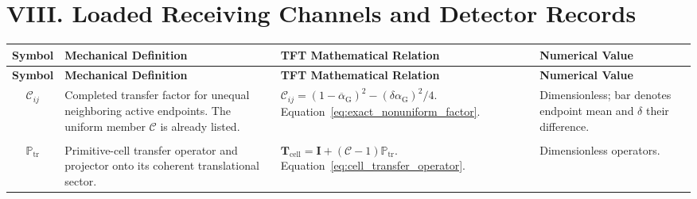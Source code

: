 \newpage
\section*{VIII. Loaded Receiving Channels and Detector Records}

\vspace{0.5cm}
\noindent
\renewcommand{\arraystretch}{1.6}
\begin{longtable}{@{} c p{5.5cm} p{4cm} p{3.5cm} @{}}
\toprule
\textbf{Symbol} & {\raggedright \textbf{Mechanical Definition}\par} & {\raggedright \textbf{TFT Mathematical Relation}\par} & {\raggedright \textbf{Numerical Value}\par} \\
\midrule
\endfirsthead

\toprule
\textbf{Symbol} & {\raggedright \textbf{Mechanical Definition}\par} & {\raggedright \textbf{TFT Mathematical Relation}\par} & {\raggedright \textbf{Numerical Value}\par} \\
\midrule
\endhead

$\mathcal C_{ij}$ & {\raggedright Completed transfer factor for unequal neighboring active endpoints. The uniform member $\mathcal C$ is already listed.\par} & {\raggedright $\mathcal C_{ij}=(1-\overline\alpha_{\mathrm G})^2-(\delta\alpha_{\mathrm G})^2/4$. \newline Equation~\eqref{eq:exact_nonuniform_factor}.\par} & {\raggedright Dimensionless; bar denotes endpoint mean and $\delta$ their difference.\par} \\

\begin{tabular}[c]{@{}c@{}}$\mathbf T_{\mathrm{cell}}$ \\ $\mathbb P_{\mathrm{tr}}$\end{tabular} & {\raggedright Primitive-cell transfer operator and projector onto its coherent translational sector.\par} & {\raggedright $\mathbf T_{\mathrm{cell}}=\mathbf I+(\mathcal C-1)\mathbb P_{\mathrm{tr}}$. \newline Equation~\eqref{eq:cell_transfer_operator}.\par} & {\raggedright Dimensionless operators.\par} \\


\end{longtable}
